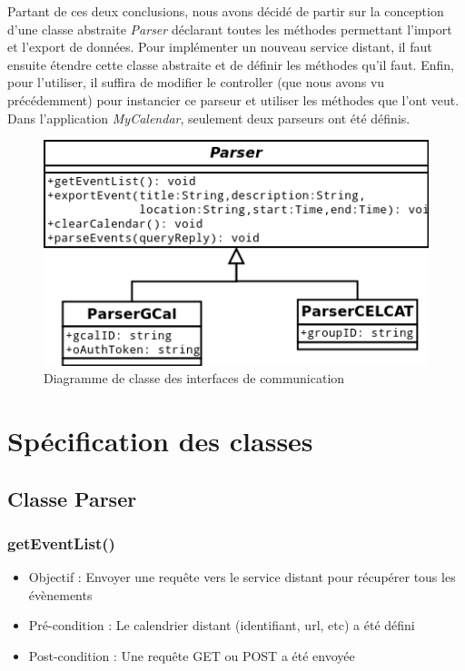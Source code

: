 {	Partant de ces deux conclusions, nous avons décidé de partir sur la conception d'une classe abstraite \emph{Parser} déclarant toutes les méthodes permettant l'import et l'export de données. Pour implémenter un nouveau service distant, il faut ensuite étendre cette classe abstraite et de définir les méthodes qu'il faut. Enfin, pour l'utiliser, il suffira de modifier le controller (que nous avons vu précédemment) pour instancier ce parseur et utiliser les méthodes que l'ont veut.\\
	
	Dans l'application \emph{MyCalendar}, seulement deux parseurs ont été définis.
	\begin{figure}[!h]
		\centering
		\includegraphics[scale=0.65]{diagclasses_parser.png}
		\caption{Diagramme de classe des interfaces de communication}
	\end{figure}
	\FloatBarrier
	
	\section{Spécification des classes}
		\subsection{Classe Parser}
			\subsubsection{getEventList()}
				\begin{itemize}
					\item Objectif  : Envoyer une requête vers le service distant pour récupérer tous les évènements
					\item Pré-condition : Le calendrier distant (identifiant, url, etc) a été défini
					\item Post-condition : Une requête GET ou POST a été envoyée
				\end{itemize}
				
}
